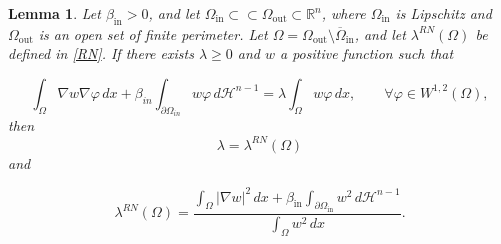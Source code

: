 \documentclass[oneside,a4paper,11pt,notitlepage]{article}
\theoremstyle{plain}
\numberwithin{teor}{section}
\numberwithin{equation}{section}
\theoremstyle{definition}
\theoremstyle{plain}
\newtheorem{lemma}[lemma]{Lemma}
\theoremstyle{plain}
\theoremstyle{plain}
\theoremstyle{plain}
\theoremstyle{definition}
\theoremstyle{definition}
\theoremstyle{plain}
\begin{document}
\begin{lemma}\label{autofpos}
Let $\beta_{\mathrm{in}} > 0$, and let $\Omega_{\mathrm{in}} \subset\subset \Omega_{\mathrm{out}} \subset \mathbb{R}^n$, where $\Omega_{\mathrm{in}}$ is Lipschitz and $\Omega_{\mathrm{out}}$ is an open set of finite perimeter. Let $\Omega = \Omega_{\mathrm{out}} \setminus \overline{\Omega}_{\mathrm{in}}$, and let $\lambda^{RN}(\Omega)$ be defined in \eqref{RN}. 
    If there exists $\lambda \geq 0$ and  $w$ a positive function such that  
    
\begin{equation}
\label{weakrn}
    \int _\Omega \nabla w \nabla \varphi \, dx+\beta_{in} \int_{\partial\Omega_{in}} w \varphi \, d \mathcal{H}^{n-1} = \lambda\int_{\Omega} w \varphi \, dx, \qquad \forall \varphi \in W^{1,2}(\Omega),
    \end{equation}
then \begin{equation}
\label{lambda=rn}
    \lambda=\lambda^{RN}(\Omega)
\end{equation}
and 

\begin{equation*}
    \lambda^{RN}(\Omega)
=
\frac{\displaystyle 
      \int_\Omega |\nabla w|^2\, dx 
      + \beta_{\mathrm{in}} \int_{\partial \Omega_{\mathrm{in}}} w^2\, d\mathcal{H}^{n-1}
     }
     {\displaystyle 
      \int_\Omega w^2\, dx
     }.
\end{equation*}
\end{lemma}
\end{document}
